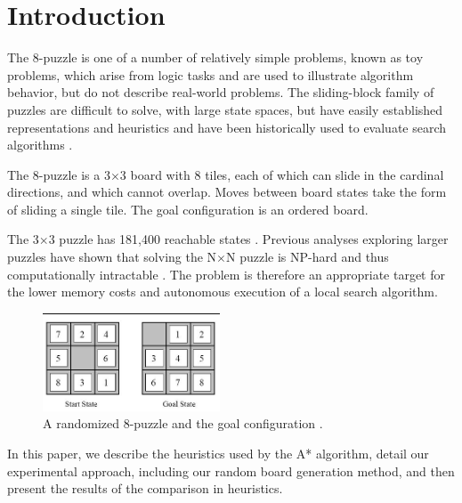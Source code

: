 
\section{Introduction}
\label{sec:intro}

The 8-puzzle is one of a number of relatively simple problems, known as toy problems, which arise from logic tasks and are used to illustrate algorithm behavior, but do not describe real-world problems. The sliding-block family of puzzles are difficult to solve, with large state spaces, but have easily established representations and heuristics and have been historically used to evaluate search algorithms \cite{intractable}. 

The 8-puzzle is a 3$\times$3 board with 8 tiles, each of which can slide in the cardinal directions, and which cannot overlap.  Moves between board states take the form of sliding a single tile.  The goal configuration is an ordered board. 

The 3$\times$3 puzzle has 181,400 reachable states \cite{aima}.  Previous analyses exploring larger puzzles have shown that solving the N$\times$N puzzle is NP-hard and thus computationally intractable \cite{intractable}.  The problem is therefore an appropriate target for the lower memory costs and autonomous execution of a local search algorithm. 

\begin{figure}[ht]
	\centering
	\includegraphics[width=0.47\textwidth]{figs/8-Puzzle.jpg}
	\caption{A randomized 8-puzzle and the goal configuration \cite{fig:puzzle}.}
	\label{fig:puzzle}
\end{figure}

In this paper, we describe the heuristics used by the A* algorithm, detail our experimental approach, including our random board generation method, and then present the results of the comparison in heuristics.


